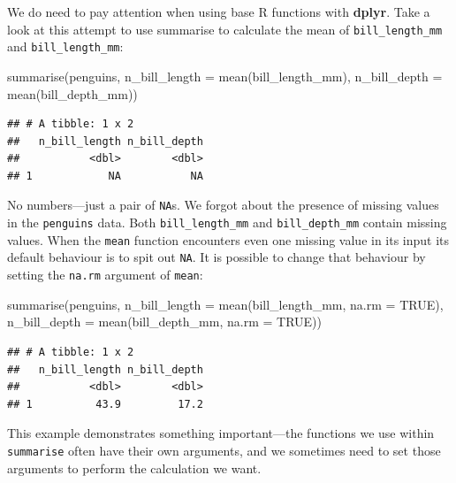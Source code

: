\documentclass[
]{book}
\newenvironment{Shaded}{\begin{snugshade}}{\end{snugshade}}
\newcommand{\AttributeTok}[1]{\textcolor[rgb]{0.77,0.63,0.00}{#1}}
\newcommand{\ConstantTok}[1]{\textcolor[rgb]{0.00,0.00,0.00}{#1}}
\newcommand{\FunctionTok}[1]{\textcolor[rgb]{0.00,0.00,0.00}{#1}}
\newcommand{\NormalTok}[1]{#1}
\begin{document}
We do need to pay attention when using base R functions with \textbf{dplyr}. Take a look at this attempt to use summarise to calculate the mean of \texttt{bill\_length\_mm} and \texttt{bill\_length\_mm}:

\begin{Shaded}
\begin{Highlighting}[]
\FunctionTok{summarise}\NormalTok{(penguins, }
          \AttributeTok{n\_bill\_length =} \FunctionTok{mean}\NormalTok{(bill\_length\_mm), }
          \AttributeTok{n\_bill\_depth  =} \FunctionTok{mean}\NormalTok{(bill\_depth\_mm))}
\end{Highlighting}
\end{Shaded}

\begin{verbatim}
## # A tibble: 1 x 2
##   n_bill_length n_bill_depth
##           <dbl>        <dbl>
## 1            NA           NA
\end{verbatim}

No numbers---just a pair of \texttt{NA}s. We forgot about the presence of missing values in the \texttt{penguins} data. Both \texttt{bill\_length\_mm} and \texttt{bill\_depth\_mm} contain missing values. When the \texttt{mean} function encounters even one missing value in its input its default behaviour is to spit out \texttt{NA}. It is possible to change that behaviour by setting the \texttt{na.rm} argument of \texttt{mean}:

\begin{Shaded}
\begin{Highlighting}[]
\FunctionTok{summarise}\NormalTok{(penguins, }
          \AttributeTok{n\_bill\_length =} \FunctionTok{mean}\NormalTok{(bill\_length\_mm, }\AttributeTok{na.rm =} \ConstantTok{TRUE}\NormalTok{), }
          \AttributeTok{n\_bill\_depth  =} \FunctionTok{mean}\NormalTok{(bill\_depth\_mm,  }\AttributeTok{na.rm =} \ConstantTok{TRUE}\NormalTok{))}
\end{Highlighting}
\end{Shaded}

\begin{verbatim}
## # A tibble: 1 x 2
##   n_bill_length n_bill_depth
##           <dbl>        <dbl>
## 1          43.9         17.2
\end{verbatim}

This example demonstrates something important---the functions we use within \texttt{summarise} often have their own arguments, and we sometimes need to set those arguments to perform the calculation we want.
\end{document}
